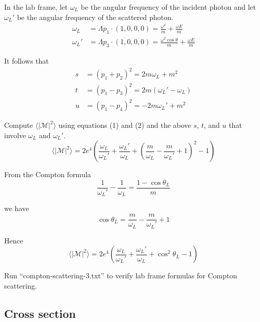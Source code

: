 \documentclass[12pt]{article}
\begin{document}
\noindent
In the lab frame, let $\omega_L$ be the angular frequency of the incident photon
and let $\omega_L'$ be the angular frequency of the scattered photon.
\begin{equation*}
\begin{aligned}
\omega_L&=\Lambda p_1\cdot(1,0,0,0)=\frac{\omega^2}{m}+\frac{\omega E}{m}
\\
\omega_L'&=\Lambda p_3\cdot(1,0,0,0)=\frac{\omega^2\cos\theta}{m}+\frac{\omega E}{m}
\end{aligned}
\end{equation*}

\noindent
It follows that
\begin{equation*}
\begin{aligned}
s&=(p_1+p_2)^2=2m\omega_L+m^2
\\
t&=(p_1-p_3)^2=2m(\omega_L' - \omega_L)
\\
u&=(p_1-p_4)^2=-2 m \omega_L' + m^2
\end{aligned}
\end{equation*}

\noindent
Compute $\langle|\mathcal{M}|^2\rangle$ using equations (1) and (2)
and the above $s$, $t$, and $u$ that involve $\omega_L$ and $\omega_L'$.
\begin{equation*}
\langle|\mathcal{M}|^2\rangle=
2e^4\left(
\frac{\omega_L}{\omega_L'}+\frac{\omega_L'}{\omega_L}
+\left(\frac{m}{\omega_L}-\frac{m}{\omega_L'}+1\right)^2-1
\right)
\end{equation*}

\noindent
From the Compton formula
\begin{equation*}
\frac{1}{\omega_L'}-\frac{1}{\omega_L}=\frac{1-\cos\theta_L}{m}
\end{equation*}

\noindent
we have
\begin{equation*}
\cos\theta_L=\frac{m}{\omega_L}-\frac{m}{\omega_L'}+1
\end{equation*}

\noindent
Hence
\begin{equation*}
\langle|\mathcal{M}|^2\rangle=
2e^4\left(
\frac{\omega_L}{\omega_L'}+\frac{\omega_L'}{\omega_L}+\cos^2\theta_L-1
\right)
\end{equation*}

\noindent
Run ``compton-scattering-3.txt'' to verify lab frame formulas for Compton scattering.

\subsection*{Cross section}
\end{document}
